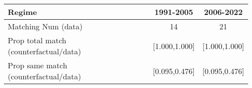 
\begin{tabular}[t]{lccc}
\toprule
Regime &  & 1991-2005 & 2006-2022\\
\midrule
Matching Num (data) &  & 14 & 21\\
Prop total match (counterfactual/data) &  & {}[1.000,1.000] & {}[1.000,1.000]\\
Prop same match (counterfactual/data) &  & {}[0.095,0.476] & {}[0.095,0.476]\\
\bottomrule
\end{tabular}
